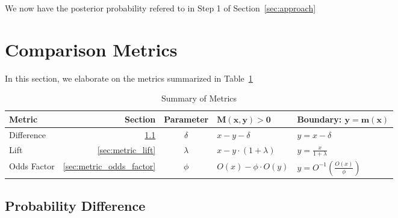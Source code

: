 \documentclass[letterpaper,12pt]{article}
\newcommand{\bb}[1]{\mathbf{#1}}
\begin{document}
We now have the posterior probability refered to in Step 1 of
Section~\ref{sec:approach}

\section{Comparison Metrics}
\label{sec:metrics}
In this section, we elaborate on the metrics summarized in
Table~\ref{table:metrics}
\begin{table}
\centering
\begin{tabular}{|l|r|c|l|l|} \hline \hline
{\bf Metric} & {\bf Section} & {\bf Parameter} & \(\bb{M(x, y) > 0}\) & {\bf Boundary: }\(\bb{y = m(x)}\) \\ \hline \hline
Difference & \ref{sec:metric_diff} & \(\delta\) & \(x - y - \delta\)& \(y = x - \delta\) \\ \hline 
%
Lift & \ref{sec:metric_lift}& \(\lambda\) & \(x - y \cdot (1+\lambda)\) & \(y = \frac{x}{1+\lambda}\)\\ \hline 
%
Odds Factor & \ref{sec:metric_odds_factor} & \(\phi \)
& \(O(x)-\phi\cdot O(y)\)
  & \(y = O^{-1} \left( \frac{O(x)}{\phi}\right)\)\\ \hline
\hline
\end{tabular}
\caption{Summary of Metrics}
\label{table:metrics}
\end{table}

\subsection{Probability Difference}
\label{sec:metric_diff}
\end{document}
